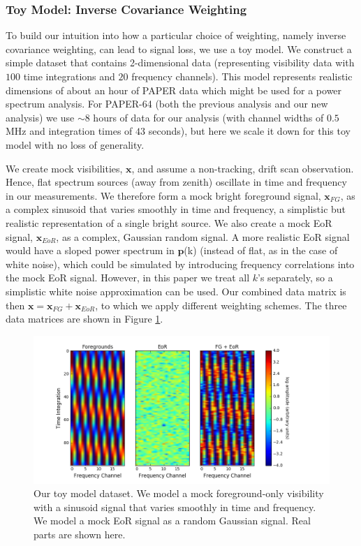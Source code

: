 \documentclass[preprint2,numberedappendix,tighten]{aastex6}  %
\begin{document}
\subsubsection{Toy Model: Inverse Covariance Weighting}
\label{sec:toymodel}

To build our intuition into how a particular choice of weighting, namely inverse covariance weighting, can lead to signal loss, we 
use a toy model. We construct a simple dataset that contains 2-dimensional data (representing visibility data with $100$ time 
integrations and $20$ frequency channels). This model represents realistic dimensions of about an hour of PAPER data which 
might be used for a power spectrum analysis. For PAPER-64 (both the previous analysis and our new analysis) we use $\sim$$8$ hours of data for our analysis (with channel 
widths of $0.5$ MHz and integration times of $43$ seconds), but here we scale it down for this toy model with no loss of 
generality. 

We create mock visibilities, $\textbf{x}$, and assume a non-tracking, drift scan observation. Hence, flat spectrum sources (away 
from zenith) oscillate in time and frequency in our measurements. We therefore form a mock bright foreground signal, $
\textbf{x}_{FG}$, as a complex sinusoid that varies smoothly in time and frequency, a simplistic but realistic representation of a 
single bright source. We also create a mock EoR signal, $\textbf{x}_{EoR}$, as a complex, Gaussian random signal. A more 
realistic EoR signal would have a sloped power spectrum in $\textbf{p}$(k) (instead of flat, as in the case of white noise), 
which could be simulated by introducing frequency correlations into the mock EoR signal. However, in this paper we treat all 
$k$'s separately, so a simplistic white noise approximation can be used. Our combined data matrix is then $\textbf{x} = 
\textbf{x}_{FG} + \textbf{x}_{EoR}$, to which we apply different weighting schemes. The three data matrices are shown in Figure 
\ref{fig:toy_sigloss1}. 

\begin{figure}
	\centering
	\includegraphics[trim={1.5cm 0cm 3.5cm 0.3cm},clip,width=\columnwidth]{plots/toy_sigloss1.png}
	\caption{Our toy model dataset. We model a mock foreground-only visibility with a sinusoid signal that varies smoothly in 
time and frequency. We model a mock EoR signal as a random Gaussian signal. Real parts are shown here.}
	\label{fig:toy_sigloss1}
\end{figure}
\end{document}
